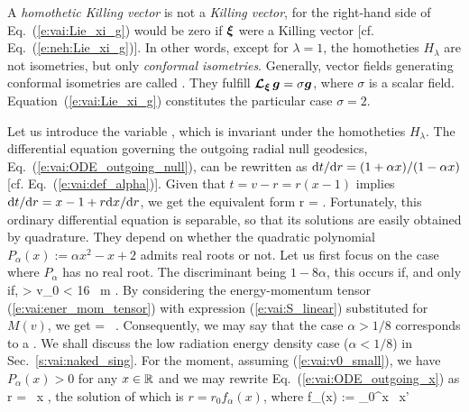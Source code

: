 \begin{remark}
A \emph{homothetic Killing vector} is not a \emph{Killing vector},
for the right-hand side of Eq.~(\ref{e:vai:Lie_xi_g}) would be zero if
$\bm{\xi}$ were a Killing vector [cf. Eq.~(\ref{e:neh:Lie_xi_g})].
In other words, except for $\lambda=1$, the homotheties $H_\lambda$ are not isometries,
but only \emph{conformal isometries}.
Generally, vector fields generating conformal isometries are
called .
They fulfill $\bm{\mathcal{L}}_{\bm{\xi}}\, \bm{g} = \sigma \bm{g}$, where $\sigma$ is a scalar field.
Equation~(\ref{e:vai:Lie_xi_g}) constitutes the particular case $\sigma = 2$.
\end{remark}

Let us introduce the variable
\be \label{e:vai:def_x_v_r}
    ,
\ee
which is invariant under the homotheties $H_\lambda$.
The differential equation governing the outgoing radial null
geodesics, Eq.~(\ref{e:vai:ODE_outgoing_null}),
can be rewritten as $\mathrm{d} t / \mathrm{d} r = (1 + \alpha x)/(1 - \alpha x)$ [cf. Eq.~(\ref{e:vai:def_alpha})].
Given that $t = v - r = r(x - 1)$ implies $\mathrm{d} t / \mathrm{d} r = x - 1 + r \mathrm{d} x/\mathrm{d} r$,
we get the equivalent form
\be \label{e:vai:ODE_outgoing_x}
    r  =  .
\ee
Fortunately, this ordinary differential equation is separable, so that its
solutions are easily obtained by quadrature. They depend on whether the
quadratic polynomial $P_\alpha(x) := \alpha x^2 - x + 2$ admits real roots
or not.
Let us first focus on the case where $P_\alpha$ has no real root.
The discriminant being $1 - 8\alpha$, this occurs if, and only if,
\be \label{e:vai:v0_small}
    \alpha >  \iff v_0 < 16 \, m .
\ee
By considering the energy-momentum tensor (\ref{e:vai:ener_mom_tensor}) with
expression (\ref{e:vai:S_linear}) substituted for $M(v)$, we get
\be \label{e:vai:T_alpha}
 = \,  \otimes {} .
\ee
Consequently, we may say that the case $\alpha > 1/8$
corresponds to
a .
We shall discuss the low radiation energy density case
($\alpha < 1/8$)
in Sec.~\ref{s:vai:naked_sing}.
For the moment, assuming (\ref{e:vai:v0_small}),
we have $P_\alpha(x) > 0$ for any $x\in\mathbb{R}$ and we may rewrite Eq.~(\ref{e:vai:ODE_outgoing_x})
as
\be \label{e:vai:ODE_outgoing_x_sep}
    \D \ln r = \, \D x ,
\ee
the solution of which is $r = r_0 f_\alpha(x)$, where
\be \label{e:vai:lnf_alpha}
    \ln f_\alpha(x) := \int_0^x \, \D x'
